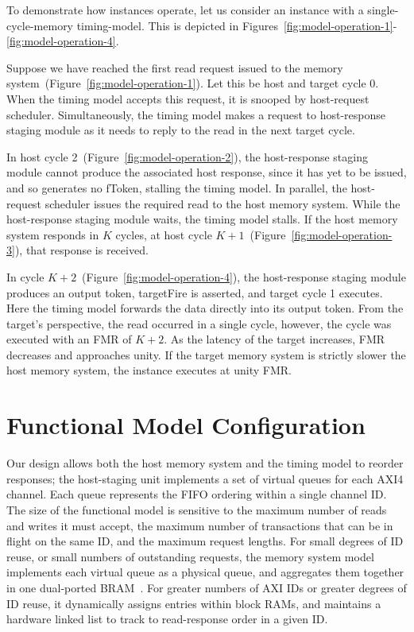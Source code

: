 To demonstrate how \PNAME instances operate, let us consider an instance with a
single-cycle-memory timing-model. This is depicted in Figures~\ref{fig:model-operation-1}-\ref{fig:model-operation-4}.

Suppose we have reached the first read request issued to the memory
system~(Figure~\ref{fig:model-operation-1}).  Let this be host and target cycle
0. When the timing model accepts this request, it is snooped by
host-request scheduler.  Simultaneously, the timing model makes a request
to host-response staging module as it needs to reply to the read in the next
target cycle.

In host cycle 2~(Figure~\ref{fig:model-operation-2}), the host-response staging module cannot produce
the associated host response, since it has yet to be issued, and so generates
no fToken, stalling the timing model. In parallel, the host-request scheduler
issues the required read to the host memory system.
While the host-response staging module waits, the timing model
stalls. If the host memory system responds in $K$ cycles, at host
cycle $K+1$~(Figure~\ref{fig:model-operation-3}), that response is received.

In cycle $K+2$~(Figure~\ref{fig:model-operation-4}), the host-response staging module produces an
output token, targetFire is asserted, and target cycle 1 executes. Here the
timing model forwards the data directly into its output token.
From the target's perspective, the read occurred in a single cycle, however,
the cycle was executed with an FMR of $K+2$.  As the latency of the
target increases, FMR decreases and approaches unity.  If the
target memory system is strictly slower the host memory system, the instance
executes at unity FMR.

\section{Functional Model Configuration}\label{egress}
Our design allows both the host memory system and the timing model to reorder
responses; the host-staging unit implements a set of virtual queues for each
AXI4 channel. Each queue represents the FIFO ordering within a single channel
ID. The size of the functional model is sensitive to the maximum number of reads
and writes it must accept, the maximum number of transactions that can be in
flight on the same ID, and the maximum request lengths. For small degrees of ID
reuse, or small numbers of outstanding requests, the memory system model
implements each virtual queue as a physical queue, and aggregates them together in one dual-ported
BRAM~\cite{LIFPGADesign}. For greater numbers of AXI IDs or greater degrees of ID
reuse, it dynamically assigns entries within block RAMs, and maintains a
hardware linked list to track to read-response order in a given ID.

